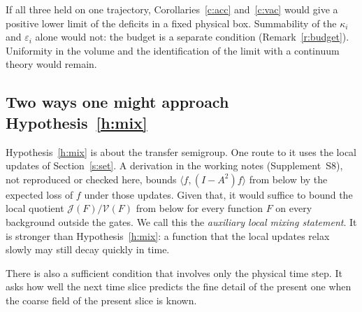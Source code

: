 If all three held on one trajectory, Corollaries~\ref{c:acc} and~\ref{c:vac} would give a positive lower
limit of the deficits in a fixed physical box. Summability of the $\kappa_i$ and $\varepsilon_i$ alone would
not: the budget is a separate condition (Remark~\ref{r:budget}). Uniformity in the volume and the
identification of the limit with a continuum theory would remain.

\subsection{Two ways one might approach Hypothesis~\ref{h:mix}}
Hypothesis~\ref{h:mix} is about the transfer semigroup. One route to it uses the local updates of
Section~\ref{s:set}. A derivation in the working notes (Supplement~S8), not reproduced or checked here, bounds
$\langle f,(I-A^2)f\rangle$ from below by the expected loss of $f$ under those updates. Given that, it would
suffice to bound the local quotient $\mathcal J(F)/\mathcal V(F)$ from below for every function $F$ on every
background outside the gates. We call this the \emph{auxiliary local mixing statement}. It is stronger than
Hypothesis~\ref{h:mix}: a function that the local updates relax slowly may still decay quickly in time.

There is also a sufficient condition that involves only the physical time step. It asks how well the next
time slice predicts the fine detail of the present one when the coarse field of the present slice is known.


